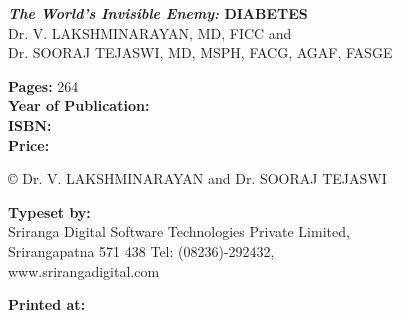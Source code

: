 \thispagestyle{empty}

\noindent\textbf{\textit{The World’s Invisible Enemy:} DIABETES}\\
Dr. V. LAKSHMINARAYAN, {\small MD, FICC} and\\
Dr. SOORAJ TEJASWI, {\small MD, MSPH, FACG, AGAF, FASGE}
 
 \vfill
 
 \noindent
\textbf{Pages:} 264\\
\textbf{Year of Publication:} \\
 \textbf{ISBN:} \\
\textbf{Price:} \rupee 


 \vfill
 
\noindent © Dr. V. LAKSHMINARAYAN and Dr. SOORAJ TEJASWI
 
  \vfill
  
\noindent
\textbf{Typeset by:}\\
Sriranga Digital Software Technologies Private Limited,\\
Srirangapatna 571 438 Tel: (08236)-292432,\\
www.srirangadigital.com\\

 \vfill

\noindent
\textbf{Printed at:}






